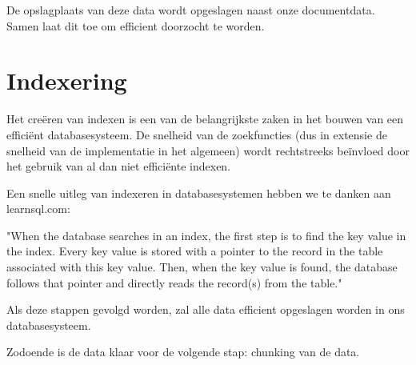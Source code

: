 De opslagplaats van deze data wordt opgeslagen naast onze documentdata.
Samen laat dit toe om efficient doorzocht te worden.

\section{Indexering}
Het creëren van indexen is een van de belangrijkste zaken in het bouwen van een efficiënt databasesysteem.
De snelheid van de zoekfuncties (dus in extensie de snelheid van de implementatie in het algemeen) wordt rechtstreeks beïnvloed door het gebruik van al dan niet efficiënte indexen.

Een snelle uitleg van indexeren in databasesystemen hebben we te danken aan learnsql.com:

\begin{displayquote}
	"When the database searches in an index, the first step is to find the key value in the index.
	Every key value is stored with a pointer to the record in the table associated with this key value.
	Then, when the key value is found, the database follows that pointer and directly reads the record(s) from the table."
	\autocite{learnSQL}
\end{displayquote}

Als deze stappen gevolgd worden, zal alle data efficient opgeslagen worden in ons databasesysteem. 

Zodoende is de data klaar voor de volgende stap: chunking van de data. 
